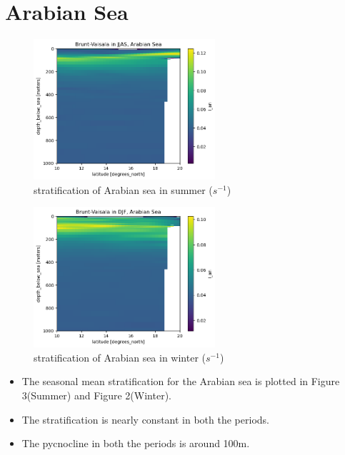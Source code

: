 \documentclass[20pt]{article}
\begin{document}
\section*{Arabian Sea}

\begin{figure}
    \centering
    \includegraphics[width=0.6\textwidth]{n_summer_as.png}
    \caption{stratification of Arabian sea in summer ($s^{-1}$)}
\end{figure}

\begin{figure}
    \centering
    \includegraphics[width=0.6\textwidth]{n_winter_as.png}
    \caption{stratification of Arabian sea in winter ($s^{-1}$)}
\end{figure}

\begin{itemize}
    \item The seasonal mean stratification for the Arabian sea is plotted in Figure 3(Summer) and Figure 2(Winter).
    \item The stratification is nearly constant in both the periods.
    \item The pycnocline in both the periods is around 100m. 
\end{itemize}
\end{document}
